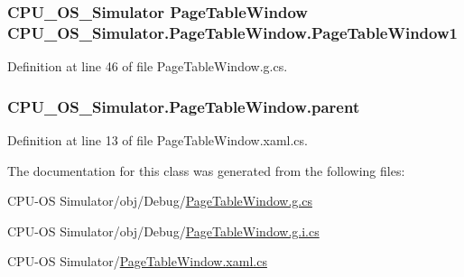 \subsubsection[{Page\+Table\+Window1}]{\setlength{\rightskip}{0pt plus 5cm}C\+P\+U\+\_\+\+O\+S\+\_\+\+Simulator {\bf Page\+Table\+Window} C\+P\+U\+\_\+\+O\+S\+\_\+\+Simulator.\+Page\+Table\+Window.\+Page\+Table\+Window1\hspace{0.3cm}{\ttfamily [package]}}\label{class_c_p_u___o_s___simulator_1_1_page_table_window_ac72a468cc382de9caf8ccac13b35d755}


Definition at line 46 of file Page\+Table\+Window.\+g.\+cs.

\hypertarget{class_c_p_u___o_s___simulator_1_1_page_table_window_a1903e0b83820829549f74207cd209337}{}
\subsubsection[{parent}]{ C\+P\+U\+\_\+\+O\+S\+\_\+\+Simulator.\+Page\+Table\+Window.\+parent\hspace{0.3cm}{\ttfamily [private]}}\label{class_c_p_u___o_s___simulator_1_1_page_table_window_a1903e0b83820829549f74207cd209337}


Definition at line 13 of file Page\+Table\+Window.\+xaml.\+cs.



The documentation for this class was generated from the following files\+:\begin{DoxyCompactItemize}
\item 
C\+P\+U-\/\+O\+S Simulator/obj/\+Debug/\hyperlink{_debug_2_page_table_window_8g_8cs}{Page\+Table\+Window.\+g.\+cs}\item 
C\+P\+U-\/\+O\+S Simulator/obj/\+Debug/\hyperlink{_debug_2_page_table_window_8g_8i_8cs}{Page\+Table\+Window.\+g.\+i.\+cs}\item 
C\+P\+U-\/\+O\+S Simulator/\hyperlink{_page_table_window_8xaml_8cs}{Page\+Table\+Window.\+xaml.\+cs}\end{DoxyCompactItemize}
